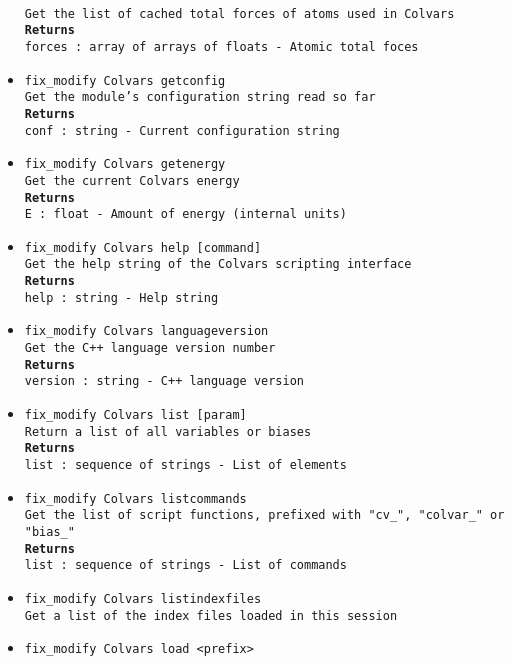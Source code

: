\begin{itemize}
\\
\texttt{Get the list of cached total forces of atoms used in Colvars}
\\
\texttt{\textbf{Returns}}
\\
\texttt{forces : array of arrays of floats - Atomic total foces}
\item \texttt{fix\_modify Colvars getconfig}
\\
\texttt{Get the module's configuration string read so far}
\\
\texttt{\textbf{Returns}}
\\
\texttt{conf : string - Current configuration string}
\item \texttt{fix\_modify Colvars getenergy}
\\
\texttt{Get the current Colvars energy}
\\
\texttt{\textbf{Returns}}
\\
\texttt{E : float - Amount of energy (internal units)}
\item \texttt{fix\_modify Colvars help [command]}
\\
\texttt{Get the help string of the Colvars scripting interface}
\\
\texttt{\textbf{Returns}}
\\
\texttt{help : string - Help string}
\item \texttt{fix\_modify Colvars languageversion}
\\
\texttt{Get the C++ language version number}
\\
\texttt{\textbf{Returns}}
\\
\texttt{version : string - C++ language version}
\item \texttt{fix\_modify Colvars list [param]}
\\
\texttt{Return a list of all variables or biases}
\\
\texttt{\textbf{Returns}}
\\
\texttt{list : sequence of strings - List of elements}
\item \texttt{fix\_modify Colvars listcommands}
\\
\texttt{Get the list of script functions, prefixed with "cv\_", "colvar\_" or "bias\_"}
\\
\texttt{\textbf{Returns}}
\\
\texttt{list : sequence of strings - List of commands}
\item \texttt{fix\_modify Colvars listindexfiles}
\\
\texttt{Get a list of the index files loaded in this session}
\item \texttt{fix\_modify Colvars load <prefix>}

\end{itemize}

